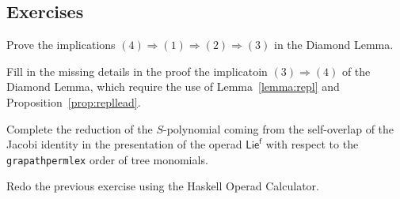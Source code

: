 \documentclass[fleqn, a4paper, twoside]{article}
\newcommand{\0}{\langle 0\rangle}
\newcommand{\f}{\mathsf{f}}
\DeclareRobustCommand{\[}{\begin{equation}}%
\DeclareRobustCommand{\]}{\end{equation}}%
\theoremstyle{mytheorem}
\theoremstyle{introthm}
\theoremstyle{mydefinition}
\theoremstyle{mydefinition2}
\theoremstyle{plain} %
\newcommand{\?}{\,?\,}
\theoremstyle{mytheorem}
\theoremstyle{plain} %
\begin{document}
\subsection{Exercises}

\begin{question}\label{ex:DiamondLemma}
Prove the implications $(4)\Longrightarrow (1) \Longrightarrow
(2)\Longrightarrow (3)$ in the Diamond Lemma.
\end{question}

\begin{question}\label{ex:fillin}
Fill in the missing details in the proof the implicatoin
$(3)\Longrightarrow (4)$ of the Diamond Lemma, which require
the use of Lemma~\ref{lemma:repl}
and Proposition~\ref{prop:repllead}. 
\end{question}

\begin{question}\label{ex:SpolyLie}
Complete the reduction of the $S$-polynomial coming from the
self-overlap of the Jacobi identity in the presentation of
the operad $\mathsf{Lie}^\f$ with respect to the 
\texttt{grapathpermlex} order of tree monomials.
\end{question}

\begin{question} 
Redo the previous exercise using the Haskell Operad Calculator.
\end{question}
\end{document}
